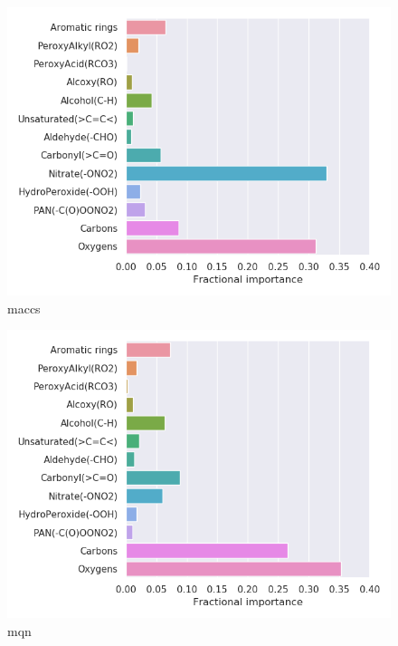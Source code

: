 \begin{subfigure}[b]{0.5\textwidth}
    \centering
    \includegraphics[width=\textwidth]{outputs/t-SNE/maccs/legend.png}
    \caption{maccs}
    \label{fig:legend_t-SNE_maccs}
\end{subfigure}
\begin{subfigure}[b]{0.5\textwidth}
    \centering
    \includegraphics[width=\textwidth]{outputs/t-SNE/mqn/legend.png}
    \caption{mqn}
    \label{fig:legend_t-SNE_mqn}
\end{subfigure}
